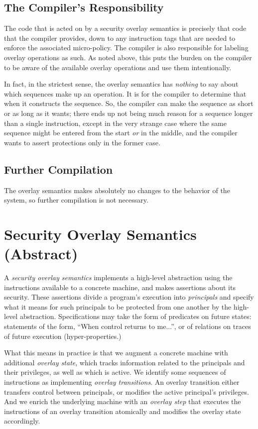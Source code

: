 \documentclass{article}
\begin{document}
\subsection{The Compiler's Responsibility}

The code that is acted on by a security overlay semantics is precisely that code
that the compiler provides, down to any instruction tags that are needed to enforce
the associated micro-policy. The compiler is also responsible for labeling overlay
operations as such. As noted above, this puts the burden on the compiler to be aware
of the available overlay operations and use them intentionally.

In fact, in the strictest sense, the overlay semantics has {\it nothing} to say
about which sequences make up an operation. It is for the compiler to determine that
when it constructs the sequence. So, the compiler can make the sequence as short or
as long as it wants; there ends up not being much reason for a sequence longer than
a single instruction, except in the very strange case where the same sequence might be
entered from the start {\it or} in the middle, and the compiler wants to assert protections
only in the former case.

\subsection{Further Compilation}

The overlay semantics makes absolutely no changes to the behavior of the system,
so further compilation is not necessary.

\section{Security Overlay Semantics (Abstract)}

A {\it security overlay semantics} implements a high-level abstraction
using the instructions available to a concrete machine, and makes assertions
about its security. These assertions divide a program's execution into
{\it principals} and specify what it means for such principals to be
protected from one another by the high-level abstraction.
Specifications may take the form of predicates on
future states: statements of the form, ``When control returns to me...'',
or of relations on traces of future execution (hyper-properties.)

What this means in practice is that we augment a concrete machine with
additional {\it overlay state}, which tracks information related to the
principals and their privileges, as well as which is active.
We identify some sequences of instructions
as implementing {\it overlay transitions}. An overlay transition either
transfers control between principals, or modifies the active principal's
privileges. And we enrich the underlying machine with an {\it overlay step}
that executes the instructions of an overlay transition atomically
and modifies the overlay state accordingly.
\end{document}
